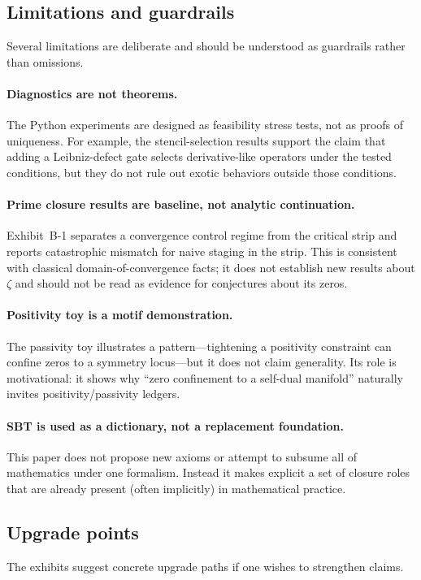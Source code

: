 \documentclass[apajournal,article,submit,moreauthors,pdftex]{Definitions/mdpi}
\begin{document}
\subsection{Limitations and guardrails}
Several limitations are deliberate and should be understood as guardrails rather than omissions.

\paragraph{Diagnostics are not theorems.}
The Python experiments are designed as feasibility stress tests, not as proofs of uniqueness.
For example, the stencil-selection results support the claim that adding a Leibniz-defect gate selects derivative-like operators under the tested conditions, but they do not rule out exotic behaviors outside those conditions.

\paragraph{Prime closure results are baseline, not analytic continuation.}
Exhibit~B-1 separates a convergence control regime from the critical strip and reports catastrophic mismatch for naive staging in the strip.
This is consistent with classical domain-of-convergence facts; it does not establish new results about $\zeta$ and should not be read as evidence for conjectures about its zeros.

\paragraph{Positivity toy is a motif demonstration.}
The passivity toy illustrates a pattern---tightening a positivity constraint can confine zeros to a symmetry locus---but it does not claim generality.
Its role is motivational: it shows why ``zero confinement to a self-dual manifold'' naturally invites positivity/passivity ledgers.

\paragraph{SBT is used as a dictionary, not a replacement foundation.}
This paper does not propose new axioms or attempt to subsume all of mathematics under one formalism.
Instead it makes explicit a set of closure roles that are already present (often implicitly) in mathematical practice.

\subsection{Upgrade points}
The exhibits suggest concrete upgrade paths if one wishes to strengthen claims.
\end{document}
